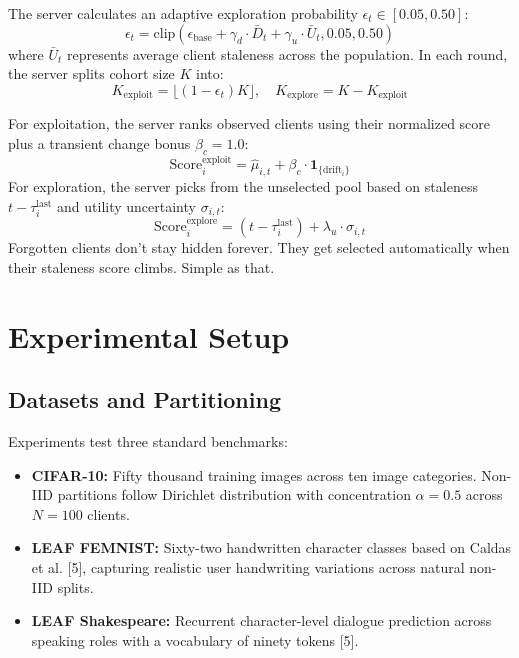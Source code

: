 \documentclass[conference]{IEEEtran}
\begin{document}
The server calculates an adaptive exploration probability $\epsilon_t \in [0.05, 0.50]$:
\begin{equation}
\epsilon_t = \text{clip}\left(\epsilon_{\text{base}} + \gamma_d \cdot \bar{D}_t + \gamma_u \cdot \bar{U}_t, 0.05, 0.50\right)
\end{equation}
where $\bar{U}_t$ represents average client staleness across the population. In each round, the server splits cohort size $K$ into:
\begin{equation}
K_{\text{exploit}} = \lfloor (1 - \epsilon_t) K \rfloor, \quad K_{\text{explore}} = K - K_{\text{exploit}}
\end{equation}

For exploitation, the server ranks observed clients using their normalized score plus a transient change bonus $\beta_c = 1.0$:
\begin{equation}
\text{Score}_i^{\text{exploit}} = \hat{\mu}_{i,t} + \beta_c \cdot \mathbf{1}_{\{\text{drift}_i\}}
\end{equation}
For exploration, the server picks from the unselected pool based on staleness $t - \tau_i^{\text{last}}$ and utility uncertainty $\sigma_{i,t}$:
\begin{equation}
\text{Score}_i^{\text{explore}} = (t - \tau_i^{\text{last}}) + \lambda_u \cdot \sigma_{i,t}
\end{equation}
Forgotten clients don't stay hidden forever. They get selected automatically when their staleness score climbs. Simple as that.

\section{Experimental Setup}

\subsection{Datasets and Partitioning}
Experiments test three standard benchmarks:
\begin{itemize}
    \item \textbf{CIFAR-10:} Fifty thousand training images across ten image categories. Non-IID partitions follow Dirichlet distribution with concentration $\alpha = 0.5$ across $N=100$ clients.
    \item \textbf{LEAF FEMNIST:} Sixty-two handwritten character classes based on Caldas et al. [5], capturing realistic user handwriting variations across natural non-IID splits.
    \item \textbf{LEAF Shakespeare:} Recurrent character-level dialogue prediction across speaking roles with a vocabulary of ninety tokens [5].
\end{itemize}
\end{document}
